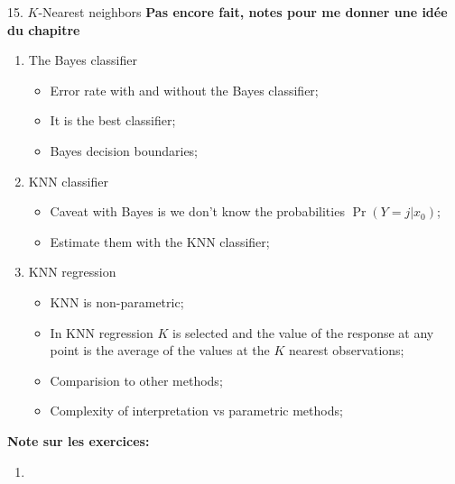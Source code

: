 \documentclass[12pt, titlepage, french]{report}
\begin{document}
\begin{CHPT_SUMM}{15. $K$-Nearest neighbors}
\textbf{Pas encore fait, notes pour me donner une idée du chapitre}
\begin{enumerate}
	\item	The Bayes classifier
	\begin{itemize}
		\item	Error rate with and without the Bayes classifier;
		\item	It is the best classifier;
		\item	Bayes decision boundaries;
	\end{itemize}
	\item	KNN classifier
	\begin{itemize}
		\item	Caveat with Bayes is we don't know the probabilities $\Pr(Y = j | x_{0})$;
		\item	Estimate them with the KNN classifier;
	\end{itemize}
	\item	KNN regression
	\begin{itemize}
		\item	KNN is non-parametric;
		\item	In KNN regression $K$ is selected and the value of the response at any point is the average of the values at the $K$ nearest observations;
		\item	Comparision to other methods;
		\item	Complexity of interpretation vs parametric methods;
	\end{itemize}
\end{enumerate}
\textbf{Note sur les exercices:} 
\begin{enumerate}
	\item	
\end{enumerate}
\end{CHPT_SUMM}
\end{document}
